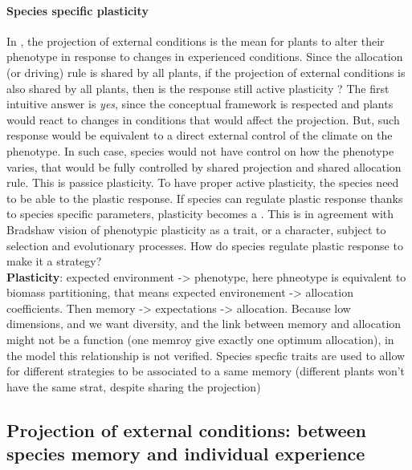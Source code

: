 \paragraph{Species specific plasticity}
In \model, the projection of external conditions is the mean for plants to alter their phenotype in response to changes in experienced conditions. Since the allocation (or driving) rule is shared by all plants, if the projection of external conditions is also shared by all plants, then is the response still active plasticity ? The first intuitive answer is \textit{yes}, since the conceptual framework is respected and plants would react to changes in conditions that would affect the projection. But, such response would be equivalent to a direct external control of the climate on the phenotype. In such case, species would not have control on how the phenotype varies, that would be fully controlled by shared projection and shared allocation rule. This is passice plasticity. To have proper active plasticity, the species need to be able to  the plastic response. If species can regulate plastic response thanks to species specific parameters, plasticity becomes a . This is in agreement with Bradshaw vision of phenotypic plasticity as a trait, or a character, subject to selection and evolutionary processes\cite{bradshaw_evolutionary_1965, bradshaw_unravelling_2006}. How do species regulate plastic response to make it a strategy?\\

\textbf{Plasticity}: expected environment -> phenotype, here phneotype is equivalent to biomass partitioning, that means expected environement -> allocation coefficients. Then memory -> expectations -> allocation. Because low dimensions, and we want diversity, and the link between memory and allocation might not be a function (one memroy give exactly one optimum allocation), in the model this relationship is not verified. Species specfic traits are used to allow for different strategies to be associated to a same memory (different plants won't have the same strat, despite sharing the projection)\\


\subsection{Projection of external conditions: between species memory and individual experience}

